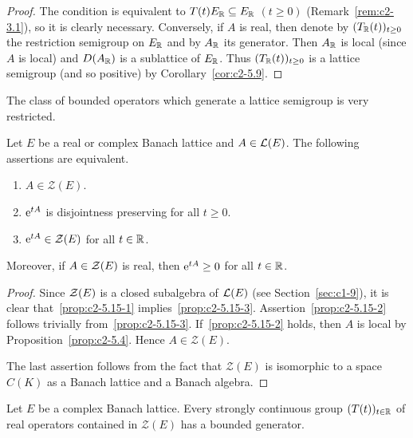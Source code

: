 \begin{proof}
The condition is equivalent to $T(t)E_{\mathbb{R}} \subseteq E_{\mathbb{R}}$ $(t \geq 0)$ (\cf Remark~\ref{rem:c2-3.1}), so it is clearly necessary.
Conversely, if\/ $A$ is real, then denote by $(T_{\R}(t))_{t \geq 0}$ the restriction semigroup on $E_{\mathbb{R}}$ and by $A_{\mathbb{R}}$ its generator.
Then $A_{\mathbb{R}}$ is local (since $A$ is local) and $D(A_{\mathbb{R}})$ is a sublattice of\/ $E_{\mathbb{R}}$.
Thus $(T_{\R}(t))_{t \geq 0}$ is a lattice semigroup (and so positive) by Corollary~\ref{cor:c2-5.9}.
\end{proof}
The class of bounded operators which generate a lattice semigroup is very restricted.
\begin{proposition}\label{prop:c2-5.15}
%
Let $E$ be a real or complex Banach lattice and $A \in \mathcal{L}(E)$. 
The following assertions are equivalent.
\begin{enumerate}[\upshape (a)]
\item \label{prop:c2-5.15-1}
$A \in \mathcal{Z}(E)$.
\item \label{prop:c2-5.15-2}
$\mathrm{e}^{tA}$ is disjointness preserving for all $t \geq 0$.
\item \label{prop:c2-5.15-3}
$\mathrm{e}^{tA} \in \mathcal{Z}(E)$ for all $t \in \mathbb{R}$.
\end{enumerate}
Moreover, if\/ $A \in \mathcal{Z}(E)$ is real, then $\eu^{tA} \geq 0$ for all $t \in \mathbb{R}$.
\end{proposition}
\begin{proof}
Since $\mathcal{Z}(E)$ is a closed subalgebra of\/ $\mathcal{L}(E)$ (see Section~\ref{sec:c1-9}), it is clear that~\ref{prop:c2-5.15-1}   implies~\ref{prop:c2-5.15-3}.
Assertion~\ref{prop:c2-5.15-2}  follows trivially from~\ref{prop:c2-5.15-3}.
If~\ref{prop:c2-5.15-2}   holds, then $A$ is local by  Proposition~\ref{prop:c2-5.4}.
Hence $A \in \mathcal{Z}(E)$.

The last assertion follows from the fact that $\mathcal{Z}(E)$ is isomorphic to a space $C(K)$ as a Banach lattice and a Banach algebra.
\end{proof}
\begin{proposition}\label{prop:c2-5.16}
%
Let $E$ be a complex Banach lattice.
Every strongly continuous group $(T(t))_{t \in \mathbb{R}}$ of real operators contained in $\mathcal{Z}(E)$ has a bounded generator.
\end{proposition}
